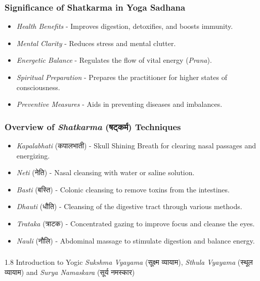 \begin{frame}[fragile]\frametitle{Significance of Shatkarma in Yoga Sadhana}

      \begin{itemize}
		\item \textit{Health Benefits} - Improves digestion, detoxifies, and boosts immunity.
		\item \textit{Mental Clarity} - Reduces stress and mental clutter.
		\item \textit{Energetic Balance} - Regulates the flow of vital energy (\textit{Prana}).
		\item \textit{Spiritual Preparation} - Prepares the practitioner for higher states of consciousness.
		\item \textit{Preventive Measures} - Aids in preventing diseases and imbalances.
	  \end{itemize}

\end{frame}

\begin{frame}[fragile]\frametitle{Overview of \textit{Shatkarma} (षट्कर्म) Techniques}

      \begin{itemize}
        \item \textit{Kapalabhati} (कपालभाती) - Skull Shining Breath for clearing nasal passages and energizing.
        \item \textit{Neti} (नेति) - Nasal cleansing with water or saline solution.
        \item \textit{Basti} (बस्ति) - Colonic cleansing to remove toxins from the intestines.
        \item \textit{Dhauti} (धौति) - Cleansing of the digestive tract through various methods.
        \item \textit{Trataka} (त्राटक) - Concentrated gazing to improve focus and cleanse the eyes.
        \item \textit{Nauli} (नौलि) - Abdominal massage to stimulate digestion and balance energy.
      \end{itemize}

\end{frame}



\begin{frame}[fragile]\frametitle{}
\begin{center}
{\Large 1.8 Introduction to Yogic \textit{Sukshma Vyayama} (सूक्ष्म व्यायाम), \textit{Sthula Vyayama} (स्थूल व्यायाम) and \textit{Surya Namaskara} (सूर्य नमस्कार)}
\end{center}
\end{frame}


